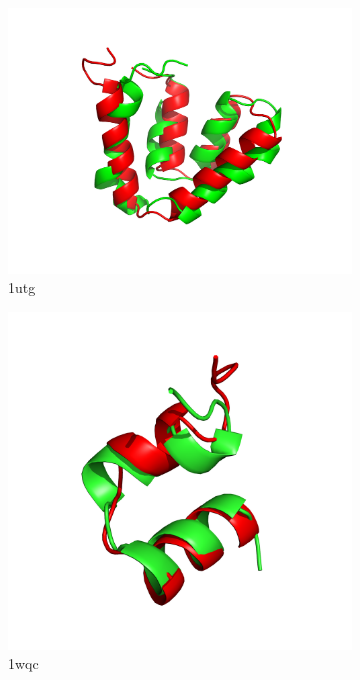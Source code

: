\begin{figure}
\begin{subfigure}{0.32\linewidth}
    \includegraphics[width=0.9\linewidth]{Figuras/prots/1utg_render.png}
    \caption{1utg}
    \label{fig:1utg-conformation}
  \end{subfigure}
  \begin{subfigure}{0.32\linewidth}
    \centering
    \includegraphics[width=0.9\linewidth]{Figuras/prots/1wqc_render.png}
    \caption{1wqc}
    \label{fig:1wqc-conformation}
  \end{subfigure}
%
  \begin{subfigure}{0.32\linewidth}

\end{subfigure}
\end{figure}
